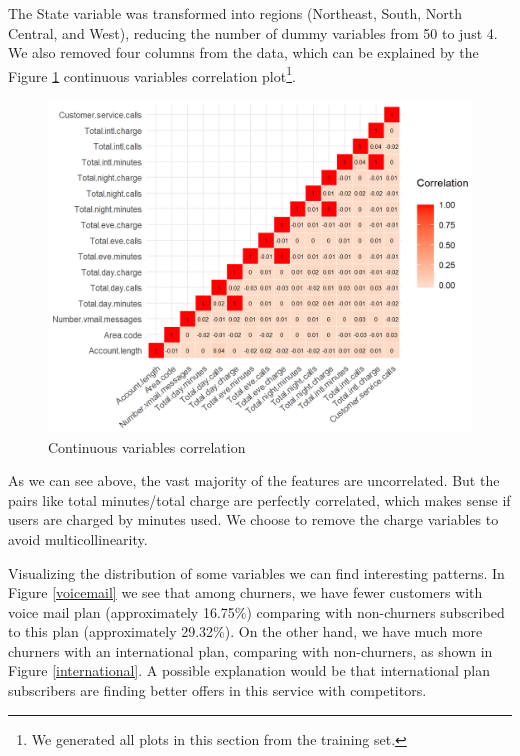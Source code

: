 \documentclass[12pt,letterpaper]{article}
\begin{document}
	The State variable was transformed into regions (Northeast, South, North Central, and West), reducing the number of dummy variables from 50 to just 4. We also removed four columns from the data, which can be explained by the Figure \ref{corr} continuous variables correlation plot\footnote{We generated all plots in this section from the training set.}. 
	
	\begin{figure}[!htb]
		\centering
		\caption{Continuous variables correlation}
		\label{corr}
		\includegraphics[scale=1]{images/corr.png}
	\end{figure}
	
	As we can see above, the vast majority of the features are uncorrelated. But the pairs like total minutes/total charge are perfectly correlated, which makes sense if users are charged by minutes used. We choose to remove the charge variables to avoid multicollinearity.
	
	Visualizing the distribution of some variables we can find interesting patterns. In Figure \ref{voicemail} we see that among churners, we have fewer customers with voice mail plan (approximately 16.75\%) comparing with non-churners subscribed to this plan (approximately 29.32\%). On the other hand, we have much more churners with an international plan, comparing with non-churners, as shown in Figure \ref{international}. A possible explanation would be that international plan subscribers are finding better offers in this service with competitors.
	
\end{document}
